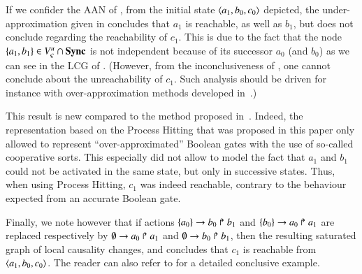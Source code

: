 \begin{example}
  If we confider the AAN of ,
  from the initial state $\mbox{$\langle a_1, b_0, c_0 \rangle$}$ depicted,
  the under-approximation given in 
  concludes that $a_1$ is reachable, as well as $b_1$, but
  does not conclude regarding the reachability of $c_1$.
  This is due to the fact that the node $\{ a_1, b_1 \} \in {V_\varsigma^u} \cap \mathbf{Sync}$
  is not independent because of its successor $a_0$ (and $b_0$)
  as we can see in the LCG of .
  (However, from the inconclusiveness of ,
  one cannot conclude about the unreachability of $c_1$.
  Such analysis should be driven for instance
  with over-approximation methods developed in~\cite{PMR12-MSCS}.)
  
  This result is new compared to the method proposed in~\cite{PMR12-MSCS}.
  Indeed, the representation based on the Process Hitting that was proposed
  in this paper only allowed to represent “over-approximated” Boolean gates
  with the use of so-called cooperative sorts.
  This especially did not allow to model the fact that $a_1$ and $b_1$ could not
  be activated in the same state, but only in successive states.
  Thus, when using Process Hitting, $c_1$ was indeed reachable,
  contrary to the behaviour expected from an accurate Boolean gate.
  
  Finally, we note however that
  if actions $\{a_0\}\rightarrow b_0\Rsh b_1$ and $\{b_0\}\rightarrow a_0\Rsh a_1$
  are replaced respectively by
  $\emptyset\rightarrow a_0\Rsh a_1$ and $\emptyset\rightarrow b_0\Rsh b_1$,
  then the resulting saturated graph of local causality changes, and
   concludes that $c_1$ is reachable from $\mbox{$\langle a_1, b_0, c_0 \rangle$}$.
  The reader can also refer to 
  for a detailed conclusive example.

\begin{figure}[tp]
  \centering
\end{figure}
\end{example}
